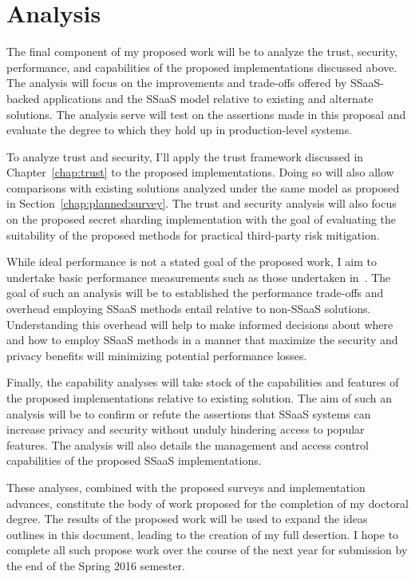 \section{Analysis}
\label{chap:planned:analysis}

The final component of my proposed work will be to analyze the trust,
security, performance, and capabilities of the proposed
implementations discussed above. The analysis will focus on the
improvements and trade-offs offered by SSaaS-backed applications and
the SSaaS model relative to existing and alternate solutions. The
analysis serve will test on the assertions made in this proposal and
evaluate the degree to which they hold up in production-level systems.

To analyze trust and security, I'll apply the trust framework
discussed in Chapter~\ref{chap:trust} to the proposed
implementations. Doing so will also allow comparisons with existing
solutions analyzed under the same model as proposed in
Section~\ref{chap:planned:survey}. The trust and security analysis
will also focus on the proposed secret sharding implementation with
the goal of evaluating the suitability of the proposed methods for
practical third-party risk mitigation.

While ideal performance is not a stated goal of the proposed work, I
aim to undertake basic performance measurements such as those
undertaken in~\cite{custos-trios}. The goal of such an analysis will
be to established the performance trade-offs and overhead employing
SSaaS methods entail relative to non-SSaaS solutions. Understanding
this overhead will help to make informed decisions about where and how
to employ SSaaS methods in a manner that maximize the security and
privacy benefits will minimizing potential performance losses.

Finally, the capability analyses will take stock of the capabilities
and features of the proposed implementations relative to existing
solution. The aim of such an analysis will be to confirm or refute the
assertions that SSaaS systems can increase privacy and security
without unduly hindering access to popular features. The analysis will
also details the management and access control capabilities of the
proposed SSaaS implementations.

These analyses, combined with the proposed surveys and implementation
advances, constitute the body of work proposed for the completion of
my doctoral degree. The results of the proposed work will be used to
expand the ideas outlines in this document, leading to the creation of
my full desertion. I hope to complete all such propose work over the
course of the next year for submission by the end of the Spring 2016
semester.

